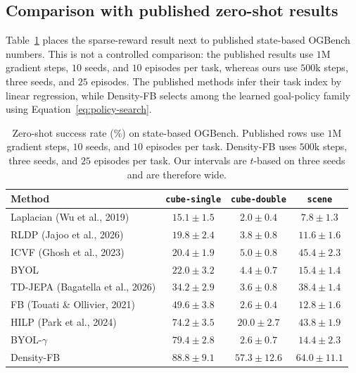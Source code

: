 \documentclass[11pt]{article}
\newcommand{\DensityFB}{Density-FB}
\begin{document}
\subsection{Comparison with published zero-shot results}

Table~\ref{tab:published} places the sparse-reward result next to published state-based OGBench numbers. This is not a controlled comparison: the published results use $1$M gradient steps, $10$ seeds, and $10$ episodes per task, whereas ours use $500$k steps, three seeds, and $25$ episodes. The published methods infer their task index by linear regression, while Density-FB selects among the learned goal-policy family using Equation~\eqref{eq:policy-search}.

\begin{table}[h]
\centering
\small
\begin{tabular}{lccc}
\toprule
Method & \texttt{cube-single} & \texttt{cube-double} & \texttt{scene} \\
\midrule
Laplacian (Wu et al., 2019) & $15.1 \pm 1.5$ & $2.0 \pm 0.4$ & $7.8 \pm 1.3$ \\
RLDP (Jajoo et al., 2026) & $19.8 \pm 2.4$ & $3.8 \pm 0.8$ & $11.6 \pm 1.6$ \\
ICVF (Ghosh et al., 2023) & $20.4 \pm 1.9$ & $5.0 \pm 0.8$ & $45.4 \pm 2.3$ \\
BYOL & $22.0 \pm 3.2$ & $4.4 \pm 0.7$ & $15.4 \pm 1.4$ \\
TD-JEPA (Bagatella et al., 2026) & $34.2 \pm 2.9$ & $3.6 \pm 0.8$ & $38.4 \pm 1.4$ \\
FB (Touati \& Ollivier, 2021) & $49.6 \pm 3.8$ & $2.6 \pm 0.4$ & $12.8 \pm 1.6$ \\
HILP (Park et al., 2024) & $74.2 \pm 3.5$ & $20.0 \pm 2.7$ & $43.8 \pm 1.9$ \\
BYOL-$\gamma$ & $79.4 \pm 2.8$ & $2.6 \pm 0.7$ & $14.4 \pm 2.3$ \\
\midrule
\DensityFB{} & $\mathbf{88.8 \pm 9.1}$ & $\mathbf{57.3 \pm 12.6}$ & $\mathbf{64.0 \pm 11.1}$ \\
\bottomrule
\end{tabular}
\caption{Zero-shot success rate (\%) on state-based OGBench. Published rows use $1$M gradient steps, $10$ seeds, and $10$ episodes per task. Density-FB uses $500$k steps, three seeds, and $25$ episodes per task. Our intervals are $t$-based on three seeds and are therefore wide.}
\label{tab:published}
\end{table}
\end{document}
